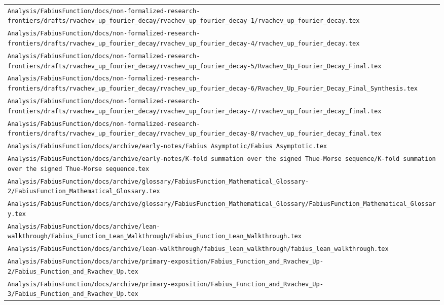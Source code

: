 \begin{longtable}{@{}p{\textwidth}@{}}
\nolinkurl{Analysis/FabiusFunction/docs/non-formalized-research-frontiers/drafts/rvachev_up_fourier_decay/rvachev_up_fourier_decay-1/rvachev_up_fourier_decay.tex}\\[0.12em]
\nolinkurl{Analysis/FabiusFunction/docs/non-formalized-research-frontiers/drafts/rvachev_up_fourier_decay/rvachev_up_fourier_decay-4/rvachev_up_fourier_decay.tex}\\[0.12em]
\nolinkurl{Analysis/FabiusFunction/docs/non-formalized-research-frontiers/drafts/rvachev_up_fourier_decay/rvachev_up_fourier_decay-5/Rvachev_Up_Fourier_Decay_Final.tex}\\[0.12em]
\nolinkurl{Analysis/FabiusFunction/docs/non-formalized-research-frontiers/drafts/rvachev_up_fourier_decay/rvachev_up_fourier_decay-6/Rvachev_Up_Fourier_Decay_Final_Synthesis.tex}\\[0.12em]
\nolinkurl{Analysis/FabiusFunction/docs/non-formalized-research-frontiers/drafts/rvachev_up_fourier_decay/rvachev_up_fourier_decay-7/rvachev_up_fourier_decay_final.tex}\\[0.12em]
\nolinkurl{Analysis/FabiusFunction/docs/non-formalized-research-frontiers/drafts/rvachev_up_fourier_decay/rvachev_up_fourier_decay-8/rvachev_up_fourier_decay_final.tex}\\[0.12em]
\nolinkurl{Analysis/FabiusFunction/docs/archive/early-notes/Fabius Asymptotic/Fabius Asymptotic.tex}\\[0.12em]
\nolinkurl{Analysis/FabiusFunction/docs/archive/early-notes/K-fold summation over the signed Thue-Morse sequence/K-fold summation over the signed Thue-Morse sequence.tex}\\[0.12em]
\nolinkurl{Analysis/FabiusFunction/docs/archive/glossary/FabiusFunction_Mathematical_Glossary-2/FabiusFunction_Mathematical_Glossary.tex}\\[0.12em]
\nolinkurl{Analysis/FabiusFunction/docs/archive/glossary/FabiusFunction_Mathematical_Glossary/FabiusFunction_Mathematical_Glossary.tex}\\[0.12em]
\nolinkurl{Analysis/FabiusFunction/docs/archive/lean-walkthrough/Fabius_Function_Lean_Walkthrough/Fabius_Function_Lean_Walkthrough.tex}\\[0.12em]
\nolinkurl{Analysis/FabiusFunction/docs/archive/lean-walkthrough/fabius_lean_walkthrough/fabius_lean_walkthrough.tex}\\[0.12em]
\nolinkurl{Analysis/FabiusFunction/docs/archive/primary-exposition/Fabius_Function_and_Rvachev_Up-2/Fabius_Function_and_Rvachev_Up.tex}\\[0.12em]
\nolinkurl{Analysis/FabiusFunction/docs/archive/primary-exposition/Fabius_Function_and_Rvachev_Up-3/Fabius_Function_and_Rvachev_Up.tex}\\[0.12em]

\end{longtable}
